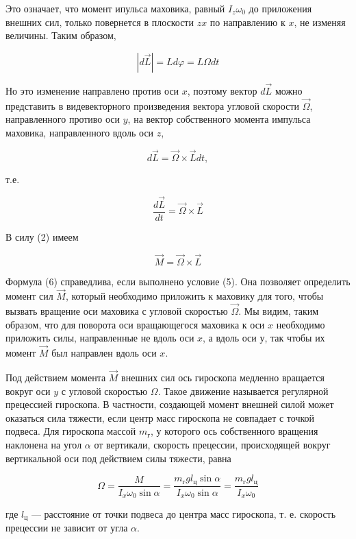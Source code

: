 \documentclass[14pt]{article}
\begin{document}
\noindent Это означает, что момент ипульса маховика, равный $I_z\omega_0$ до приложения внешних сил, только повернется в плоскости $zx$ по направлению к $x$, не изменяя величины. Таким образом,

$$|d\vec{L}| = Ld\varphi = L\Omega dt$$

\noindent Но это изменение направлено против оси $x$, поэтому вектор $d\vec{L}$ можно представить в видевекторного произведения вектора угловой скорости $\vec{\Omega}$, направленного противо оси $y$, на вектор собственного момента импульса маховика, направленного вдоль оси $z$,

$$d\vec{L} = \vec{\Omega} \times \vec{L}dt,$$

\noindent т.е.

$$\frac{d\vec{L}}{dt} = \vec{\Omega} \times \vec{L}$$

\noindent В силу (2) имеем

\begin{equation}
\vec{M} = \vec{\Omega} \times \vec{L}
\end{equation}

\noindent Формула (6) справедлива, если выполнено условие (5). Она позволяет определить момент сил $\vec{M}$, который необходимо приложить к маховику для того, чтобы вызвать вращение оси маховика с угловой скоростью $\vec{\Omega}$. Мы видим, таким образом, что для поворота оси вращающегося маховика к оси $x$ необходимо приложить силы, направленные не вдоль оси $x$, а вдоль оси у, так чтобы их момент $\vec{M}$ был направлен вдоль
оси $x$.

Под действием момента $\vec{M}$ внешних сил ось гироскопа медленно вращается вокруг оси $y$ с угловой скоростью $\Omega$. Такое движение называется регулярной прецессией гироскопа. В частности, создающей момент внешней силой может оказаться сила тяжести, если центр масс гироскопа не совпадает с точкой подвеса. Для гироскопа массой $m_{\text{г}}$, у которого ось собственного вращения наклонена на угол $\alpha$ от вертикали, скорость прецессии, происходящей вокруг вертикальной оси под действием силы тяжести, равна

\begin{equation}
\Omega = \frac{M}{I_x\omega_0\sin\alpha} = \frac{m_{\text{г}}gl_{\text{ц}}\sin\alpha}{I_x\omega_0\sin\alpha} = \frac{m_{\text{г}}gl_{\text{ц}}}{I_x\omega_0}
\end{equation}

\noindent где $l_{\text{ц}}$ --- расстояние от точки подвеса до центра масс гироскопа, т. е. скорость прецессии не зависит от угла $\alpha$. 
\end{document}
